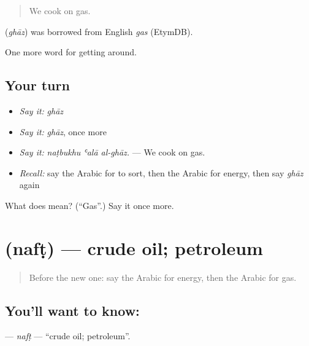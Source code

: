 \begin{quote}
We cook on gas.
\end{quote}

\begin{cousinweb}
\textbf{} (\emph{ghāz}) was borrowed from English \emph{gas} (EtymDB).
\end{cousinweb}

\begin{grammarlens}[title={What you've built}]
One more word for getting around.
\end{grammarlens}

\subsection*{Your turn}
\begin{itemize}
\raggedright
  \item \emph{Say it:} \emph{ghāz}
  \item \emph{Say it:} \emph{ghāz}, once more
  \item \emph{Say it:} \emph{naṭbukhu ʿalā al-ghāz.} — We cook on gas.
  \item \emph{Recall:} say the Arabic for to sort, then the Arabic for energy, then say \emph{ghāz} again
\end{itemize}

\begin{tcolorbox}[breakable,colback=teal!4,colframe=teal!35!black,title={Before you move on}]
What does  mean? (\textquotedblleft{}Gas\textquotedblright{}.) Say it once more.
\end{tcolorbox}
\section[\texorpdfstring{\ar{نفط} (nafṭ)}{نفط (nafṭ)}]{ (nafṭ) — crude oil; petroleum}

\label{lesson:AR-C465-naft}



\begin{quote}
Before the new one: say the Arabic for energy, then the Arabic for gas.
\end{quote}

\subsection*{You'll want to know: }
\textbf{} — \emph{nafṭ} — \textquotedblleft{}crude oil; petroleum\textquotedblright{}.

